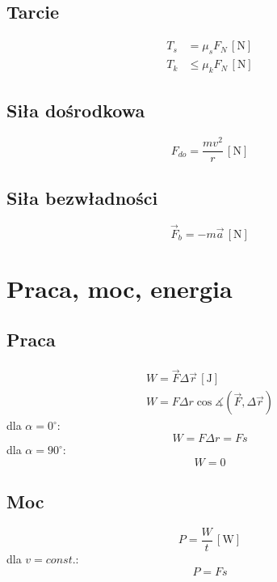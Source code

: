 \documentclass{article}
\numberwithin{equation}{section}
\newcommand{\unit}[1]{\, \left[\mathrm{#1}\right]}
\begin{document}
      \subsection{Tarcie}
        \begin{align}
          T_s &= \mu_sF_N \unit{N}\\
          T_k &\leqslant \mu_kF_N \unit{N}
        \end{align}
      \subsection{Siła dośrodkowa}
        \begin{equation}
          F_{do} = \frac{mv^2}{r} \unit{N}
        \end{equation}
        \subsection{Siła bezwładności}
        \begin{equation}
          \vec F_b = -m\vec a \unit{N}
        \end{equation}

  \newpage
  \section{Praca, moc, energia}
    \subsection{Praca}
      \begin{gather}
        W = \vec F\Delta\vec r \unit{J}\\
        W = F\Delta r \cos\measuredangle (\vec F, \Delta\vec r)
      \end{gather}
      dla $\alpha = 0^\circ$:
      \begin{equation}
        W = F\Delta r = Fs
      \end{equation}
      dla $\alpha = 90^\circ$:
      \begin{equation}
        W = 0
      \end{equation}
    \subsection{Moc}
      \begin{equation}
        P = \frac{W}{t} \unit{W}
      \end{equation}
      dla $v = const.$:
      \begin{equation}
        P = Fs
      \end{equation}
\end{document}
